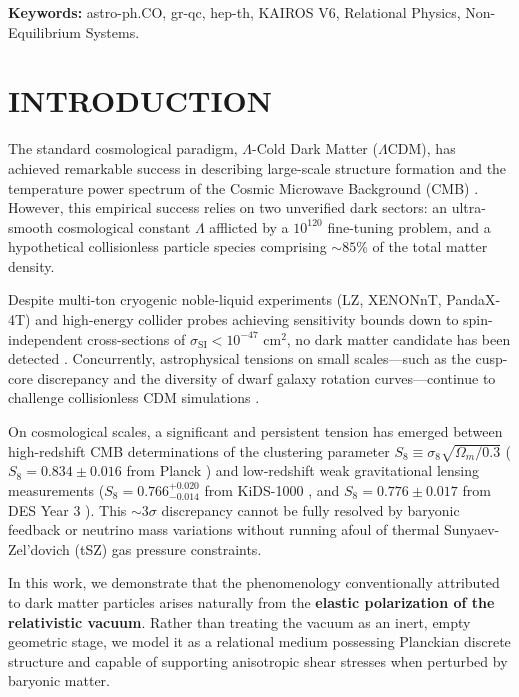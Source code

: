 \documentclass[10pt,twocolumn]{article}
\begin{document}
\vspace{1em}
\noindent\textbf{Keywords:} astro-ph.CO, gr-qc, hep-th, KAIROS V6, Relational Physics, Non-Equilibrium Systems.

\vspace{1em}






\section{INTRODUCTION}

The standard cosmological paradigm, $\Lambda$-Cold Dark Matter ($\Lambda\text{CDM}$), has achieved remarkable success in describing large-scale structure formation and the temperature power spectrum of the Cosmic Microwave Background (CMB) \cite{Planck2018}. However, this empirical success relies on two unverified dark sectors: an ultra-smooth cosmological constant $\Lambda$ afflicted by a $10^{120}$ fine-tuning problem, and a hypothetical collisionless particle species comprising $\sim 85\%$ of the total matter density.

Despite multi-ton cryogenic noble-liquid experiments (LZ, XENONnT, PandaX-4T) and high-energy collider probes achieving sensitivity bounds down to spin-independent cross-sections of $\sigma_{\text{SI}} < 10^{-47}\text{ cm}^2$, no dark matter candidate has been detected \cite{LZ2023}. Concurrently, astrophysical tensions on small scales—such as the cusp-core discrepancy and the diversity of dwarf galaxy rotation curves—continue to challenge collisionless CDM simulations \cite{Bullock2017}.

On cosmological scales, a significant and persistent tension has emerged between high-redshift CMB determinations of the clustering parameter $S_8 \equiv \sigma_8 \sqrt{\Omega_m / 0.3}$ ($S_8 = 0.834 \pm 0.016$ from Planck \cite{Planck2018}) and low-redshift weak gravitational lensing measurements ($S_8 = 0.766^{+0.020}_{-0.014}$ from KiDS-1000 \cite{KiDS1000}, and $S_8 = 0.776 \pm 0.017$ from DES Year 3 \cite{DESY3}). This $\sim 3\sigma$ discrepancy cannot be fully resolved by baryonic feedback or neutrino mass variations without running afoul of thermal Sunyaev-Zel'dovich (tSZ) gas pressure constraints.

In this work, we demonstrate that the phenomenology conventionally attributed to dark matter particles arises naturally from the \textbf{elastic polarization of the relativistic vacuum}. Rather than treating the vacuum as an inert, empty geometric stage, we model it as a relational medium possessing Planckian discrete structure \cite{Rovelli1998} and capable of supporting anisotropic shear stresses when perturbed by baryonic matter.
\end{document}
